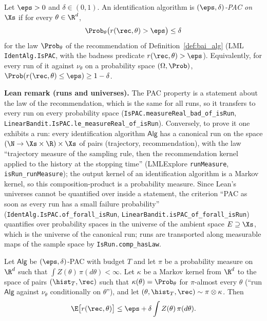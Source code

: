 \begin{definition}\label{def:pac}
\leanok
{}
Let $\eps > 0$ and $\delta \in (0,1)$. An identification algorithm is
\emph{$(\eps,\delta)$-PAC on $\Xs$} if for every $\theta \in \R^d$,
\[
  \Prob_\theta\big( r(\rec, \theta) > \eps \big) \le \delta
\]
for the law $\Prob_\theta$ of the recommendation of Definition~\ref{def:bai_alg} (LML
\texttt{IdentAlg.IsPAC}, with the badness predicate $r(\rec,\theta) > \eps$). Equivalently,
for every run of it against $\nu_\theta$ on a probability space $(\Omega,\Prob)$,
$\Prob( r(\rec, \theta) \le \eps ) \ge 1 - \delta$.
\end{definition}

\textbf{Lean remark (runs and universes).} The PAC property is a statement about the law of
the recommendation, which is the same for all runs, so it transfers to every run on every
probability space (\texttt{IsPAC.measureReal\_bad\_of\_isRun},
\texttt{LinearBandit.IsPAC.le\_measureReal\_of\_isRun}). Conversely, to prove it one exhibits
a run: every identification algorithm $\mathsf{Alg}$ has a canonical run on the space
$(\N \to \Xs\times\R)\times\Xs$ of pairs (trajectory, recommendation), with the law
``trajectory measure of the sampling rule, then the recommendation kernel applied to the history
at the stopping time'' (LMLExplore \texttt{runMeasure},
\texttt{isRun\_runMeasure}); the output kernel of an identification algorithm is a
Markov kernel, so this composition-product is a probability measure. Since Lean's universes
cannot be quantified over inside a statement, the criterion ``PAC as soon as every run has a
small failure probability'' (\texttt{IdentAlg.IsPAC.of\_forall\_isRun},
\texttt{LinearBandit.isPAC\_of\_forall\_isRun}) quantifies over probability spaces in the
universe of the ambient space $E \supseteq \Xs$, which is the universe of the canonical run;
runs are transported along measurable maps of the sample space by \texttt{IsRun.comp\_hasLaw}.

\begin{lemma}\label{lem:pac_expected_regret}
\leanok
{}
Let $\mathsf{Alg}$ be $(\eps,\delta)$-PAC with budget $T$ and let $\pi$ be a probability
measure on $\R^d$ such that $\int Z(\theta)\,\pi(d\theta) < \infty$. Let $\kappa$ be a Markov
kernel from $\R^d$ to the space of pairs $(\hist_T, \rec)$ such that $\kappa(\theta) = \Prob_\theta$
for $\pi$-almost every $\theta$ (``run $\mathsf{Alg}$ against $\nu_\theta$ conditionally on
$\theta$''), and let $(\theta, \hist_T, \rec) \sim \pi \otimes \kappa$. Then
\[
  \E\big[ r(\rec, \theta) \big] \le \eps + \delta \int Z(\theta)\, \pi(d\theta) .
\]
\end{lemma}

